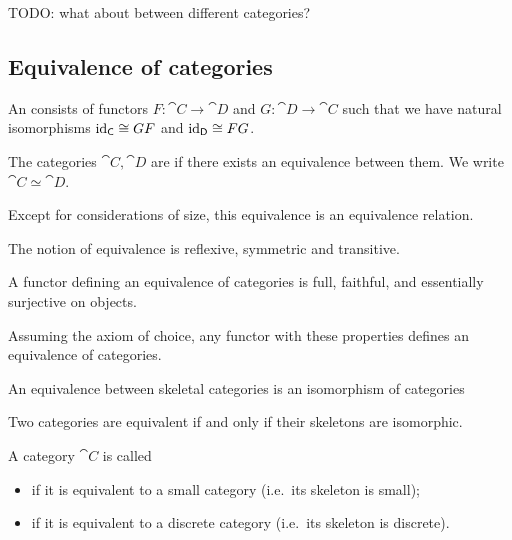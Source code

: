TODO: what about between different categories?






\subsection{Equivalence of categories}
\begin{definition}
An  consists of functors $F: \cat{C} \to \cat{D}$ and $G: \cat{D} \to \cat{C}$ such that we have natural isomorphisms $\operatorname{id}_{\mathsf{C}} \cong GF$ and $\operatorname{id}_{\mathsf{D}} \cong FG$.

The categories $\cat{C}, \cat{D}$ are  if there exists an equivalence between them. We write $\cat{C} \simeq \cat{D}$.
\end{definition}

Except for considerations of size, this equivalence is an equivalence relation.
\begin{lemma}
The notion of equivalence is reflexive, symmetric and transitive.
\end{lemma}



\begin{proposition}
A functor defining an equivalence of categories is full, faithful, and essentially surjective on objects.

Assuming the axiom of choice, any functor with these properties defines an equivalence of categories.
\end{proposition}


\begin{lemma}
An equivalence between skeletal categories is an isomorphism of categories
\end{lemma}
\begin{corollary}
Two categories are equivalent \textup{if and only if} their skeletons are isomorphic.
\end{corollary}

\begin{definition}
A category $\cat{C}$ is called
\begin{itemize}
\item {} if it is equivalent to a small category (i.e.\ its skeleton is small);
\item {} if it is equivalent to a discrete category (i.e.\ its skeleton is discrete).
\end{itemize}
\end{definition}

